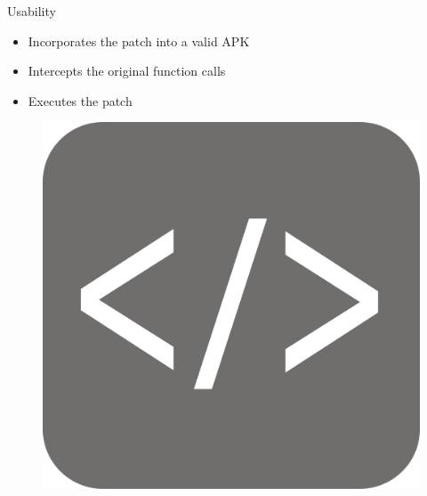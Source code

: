 \documentclass[aspectratio=169]{beamer}
[aspectratio=169] %
\begin{document}
\begin{frame}{Usability}
  \begin{minipage}{0.49\textwidth} 
    \begin{itemize}
      \item Incorporates the patch into a valid APK
      \item Intercepts the original function calls
      \item Executes the patch
    \end{itemize}
  \end{minipage}
  \hfill
  \begin{minipage}{0.49\textwidth} 
    \begin{figure}
      \centering
      \includegraphics[height=0.5\textheight]{figures/code.png}
    \end{figure}
  \end{minipage}
\end{frame}
\end{document}

